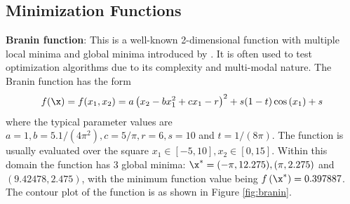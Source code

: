 \documentclass [PhD] {package/uclathes}
\begin{document}
\subsection{Minimization Functions}

  \textbf{Branin function}: This is a well-known 2-dimensional function with
  multiple local minima and global minima introduced by
  \textcite{dixon1978towards}.
  It is often used to test optimization
  algorithms due to its complexity and multi-modal nature. The
  Branin function has the form
\begin{equation*}
  f(\x)=  f(x_1, x_2)=a\left(x_2-b x_1^2+c x_1-r\right)^2+s(1-t) \cos \left(x_1\right)+s
\end{equation*}
where the typical parameter values are
\(a=1, b=5.1 /\left(4 \pi^2\right), c=5 / \pi, r=6, s=10\) and
\(t=1 /(8 \pi)\). The function is usually evaluated over the square
\(x_1 \in[-5,10], x_2 \in[0,15]\). Within this domain the function has 3
global minima: \(\x^*=(-\pi, 12.275),(\pi, 2.275)\) and
\((9.42478,2.475)\), with the minimum function value being
\(f\left(\x^*\right)=0.397887\). The contour plot of the function is as
shown in Figure \ref{fig:branin}.
\end{document}
